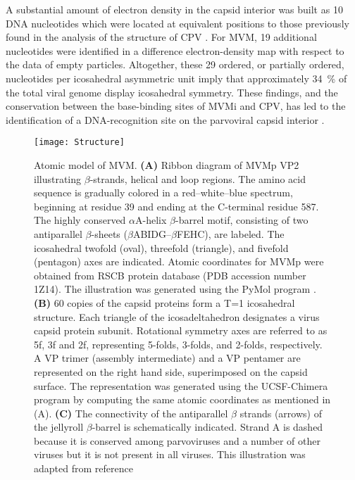 A substantial amount of electron density in the capsid interior was built as 10 DNA nucleotides which were located at equivalent positions to those previously found in the analysis of the structure of CPV \cite{pmid7735832, pmid1616694}. For MVM, 19 additional nucleotides were identified in a difference electron-density map with respect to the data of empty particles. Altogether, these 29 ordered, or partially ordered, nucleotides per icosahedral asymmetric unit imply that approximately 34~\% of the total viral genome display icosahedral symmetry. These findings, and the conservation between the base-binding sites of MVMi and CPV, has led to the identification of a DNA-recognition site on the parvoviral capsid interior \cite{pmid9817841}.    

\begin{figure}
\centering
  \texttt{[image: Structure]}\\[0.3cm]
  \caption[Structure of MVM]
   {Atomic model of MVM. \textbf{(A)} Ribbon diagram of MVMp VP2 illustrating $\beta$-strands, helical and loop regions. The amino acid sequence is gradually colored in a red–white–blue spectrum, beginning at residue 39 and ending at the C-terminal residue 587. The highly conserved $\alpha$A-helix $\beta$-barrel motif, consisting of two antiparallel $\beta$-sheets ($\beta$ABIDG–$\beta$FEHC), are labeled. The icosahedral twofold (oval), threefold (triangle), and fivefold (pentagon) axes are indicated. Atomic coordinates for MVMp were obtained from RSCB protein database (PDB accession number 1Z14). The illustration was generated using the PyMol program \cite{PyMol}. \textbf{(B)} 60 copies of the capsid proteins form a T=1 icosahedral structure. Each triangle of the icosadeltahedron designates a virus capsid protein subunit. Rotational symmetry axes are referred to as 5f, 3f and 2f, representing 5-folds, 3-folds, and 2-folds, respectively. A VP trimer (assembly intermediate) and a VP pentamer are represented on the right hand side, superimposed on the capsid surface. The representation was generated using the UCSF-Chimera program \cite{pmid15264254} by computing the same atomic coordinates as mentioned in (A). \textbf{(C)} The connectivity of the antiparallel $\beta$ strands (arrows) of the jellyroll $\beta$-barrel is schematically indicated. Strand A is dashed because it is conserved among parvoviruses and a number of other viruses but it is not present in all viruses. This illustration was adapted from reference~\cite{Structure}} 
\label{Structure1}
\end{figure}

